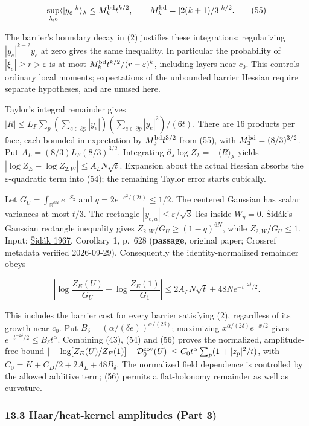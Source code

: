 \documentclass[11pt,a4paper]{article}
\begin{document}
\[\sup_{\lambda,e}\langle|y_e|^k\rangle_\lambda
\le M_k^{\rm bd}t^{k/2},\qquad M_k^{\rm bd}=[2(k+1)/3]^{k/2}.\tag{55}\]

The barrier's boundary decay in (2) justifies these integrations;
regularizing \(|y_e|^{k-2}y_e\) at zero gives the same inequality. In
particular the probability of \(|\xi_e|\ge r>\varepsilon\) is at most
\(M_k^{\rm bd}t^{k/2}/(r-\varepsilon)^k\), including layers near
\(c_0\). This controls ordinary local moments; expectations of the
unbounded barrier Hessian require separate hypotheses, and are unused
here.

Taylor's integral remainder gives
\(|R|\le L_F\sum_p(\sum_{e\in\partial p}|y_e|) (\sum_{e\in\partial p}|y_e|^2)/(6t)\).
There are 16 products per face, each bounded in expectation by
\(M_3^{\rm bd}t^{3/2}\) from (55), with \(M_3^{\rm bd}=(8/3)^{3/2}\).
Put \(A_L=(8/3)L_F(8/3)^{3/2}\). Integrating
\(\partial_\lambda\log Z_\lambda=-\langle R\rangle_\lambda\) yields
\(|\log Z_E-\log Z_{2,W}|\le A_LN\sqrt t\). Expansion about the actual
Hessian absorbs the \(\varepsilon\)-quadratic term into (54); the
remaining Taylor error starts cubically.

Let \(G_U=\int_{\mathbb R^{6N}}e^{-S_2}\) and
\(q=2e^{-\varepsilon^2/(2t)}\le1/2\). The centered Gaussian has scalar
variances at most \(t/3\). The rectangle
\(|y_{e,a}|\le\varepsilon/\sqrt3\) lies inside \(W_\eta=0\). Šidák's
Gaussian rectangle inequality gives \(Z_{2,W}/G_U\ge(1-q)^{6N}\), while
\(Z_{2,W}/G_U\le1\). Input:
\href{https://doi.org/10.1080/01621459.1967.10482935}{Šidák 1967},
Corollary 1, p.~628 (\textbf{passage}, original paper; Crossref metadata
verified 2026-09-29). Consequently the identity-normalized remainder
obeys

\[\left|\log\frac{Z_E(U)}{G_U}-\log\frac{Z_E(1)}{G_1}\right|
\le2A_LN\sqrt t+48Ne^{-t^{-2\delta}/2}.\tag{56}\]

This includes the barrier cost for every barrier satisfying (2),
regardless of its growth near \(c_0\). Put
\(B_\delta=(\alpha/(\delta e))^{\alpha/(2\delta)}\); maximizing
\(x^{\alpha/(2\delta)}e^{-x/2}\) gives
\(e^{-t^{-2\delta}/2}\le B_\delta t^\alpha\). Combining (43), (54) and
(56) proves the normalized, amplitude-free bound
\(| -\log[Z_E(U)/Z_E(1)]-\mathcal D_0^{\rm cov}(U)| \le C_0t^\alpha\sum_p(1+|z_p|^2/t)\),
with \(C_0=K+C_D/2+2A_L+48B_\delta\). The normalized field dependence is
controlled by the allowed additive term; (56) permits a flat-holonomy
remainder as well as curvature.

\hypertarget{haarheat-kernel-amplitudes-part-3}{%
\subsubsection{13.3 Haar/heat-kernel amplitudes (Part
3)}\label{haarheat-kernel-amplitudes-part-3}}
\end{document}
